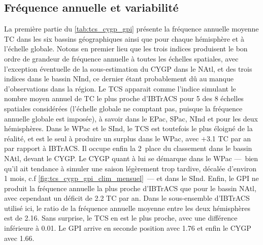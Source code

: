 \documentclass[../main.tex]{subfiles}
\begin{document}
\subsection*{Fréquence annuelle et variabilité}

La première partie du \cref{tab:tcs_cygp_gpi} présente la fréquence annuelle moyenne TC dans les six bassins géographiques ainsi que pour chaque hémisphère et à
l'échelle globale. Notons en premier lieu que les trois indices produisent le bon ordre de grandeur de fréquence annuelle à toutes les échelles spatiales, avec
l'exception éventuelle de la sous-estimation du CYGP dans le NAtl, et des trois indices dans le bassin NInd, ce dernier étant probablement dû au manque
d'observations dans la région. Le TCS apparait comme l'indice simulant le nombre moyen annuel de TC le plus proche d'IBTrACS pour \num{5} des \num{8} échelles
spatiales considérées (l'échelle globale ne comptant pas, puisque la fréquence annuelle globale est imposée), à savoir dans le EPac, SPac, NInd et pour les deux
hémisphères. Dans le WPac et le SInd, le TCS est toutefois le plus éloigné de la réalité, et est le seul à produire un surplus dans le WPac, avec $+$\num{3.1}
TC par an par rapport à IBTrACS. Il occupe enfin la 2\ieme~place du classement dans le bassin NAtl, devant le CYGP. Le CYGP quant à lui se démarque dans le WPac
---~bien qu'il ait tendance à simuler une saison légèrement trop tardive, décalée d'environ 1 mois, c.f \cref{fig:tcs_cygp_gpi_clim_mensuel}~--- et dans le
SInd. Enfin, le GPI ne produit la fréquence annuelle la plus proche d'IBTrACS que pour le bassin NAtl, avec cependant un déficit de \num{2.2} TC par an. Dans le
sous-ensemble d'IBTrACS utilisé ici, le ratio de la fréquence annuelle moyenne entre les deux hémisphères est de \num{2.16}. Sans surprise, le TCS en est le
plus proche, avec une différence inférieure à \num{0.01}. Le GPI arrive en seconde position avec \num{1.76} et enfin le CYGP avec \num{1.66}.
\end{document}
